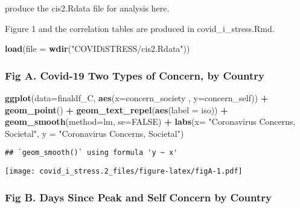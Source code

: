 \documentclass[
]{article}
\newenvironment{Shaded}{\begin{snugshade}}{\end{snugshade}}
\newcommand{\DataTypeTok}[1]{\textcolor[rgb]{0.13,0.29,0.53}{#1}}
\newcommand{\KeywordTok}[1]{\textcolor[rgb]{0.13,0.29,0.53}{\textbf{#1}}}
\newcommand{\NormalTok}[1]{#1}
\newcommand{\OperatorTok}[1]{\textcolor[rgb]{0.81,0.36,0.00}{\textbf{#1}}}
\newcommand{\OtherTok}[1]{\textcolor[rgb]{0.56,0.35,0.01}{#1}}
\newcommand{\StringTok}[1]{\textcolor[rgb]{0.31,0.60,0.02}{#1}}
\begin{document}
produce the cis2.Rdata file for analysis here.

Figure 1 and the correlation tables are produced in
covid\_i\_stress.Rmd.

\begin{Shaded}
\begin{Highlighting}[]
\KeywordTok{load}\NormalTok{(}\DataTypeTok{file =} \KeywordTok{wdir}\NormalTok{(}\StringTok{"COVIDiSTRESS/cis2.Rdata"}\NormalTok{))}
\end{Highlighting}
\end{Shaded}

\hypertarget{fig-a.-covid-19-two-types-of-concern-by-country}{%
\subsubsection{Fig A. Covid-19 Two Types of Concern, by
Country}\label{fig-a.-covid-19-two-types-of-concern-by-country}}

\begin{Shaded}
\begin{Highlighting}[]
\KeywordTok{ggplot}\NormalTok{(}\DataTypeTok{data=}\NormalTok{finaldf_C, }\KeywordTok{aes}\NormalTok{(}\DataTypeTok{x=}\NormalTok{concern_society , }\DataTypeTok{y=}\NormalTok{concern_self)) }\OperatorTok{+}
\StringTok{  }\KeywordTok{geom_point}\NormalTok{() }\OperatorTok{+}
\StringTok{  }\KeywordTok{geom_text_repel}\NormalTok{(}\KeywordTok{aes}\NormalTok{(}\DataTypeTok{label =}\NormalTok{ iso)) }\OperatorTok{+}
\StringTok{  }\KeywordTok{geom_smooth}\NormalTok{(}\DataTypeTok{method=}\NormalTok{lm, }\DataTypeTok{se=}\OtherTok{FALSE}\NormalTok{) }\OperatorTok{+}
\StringTok{  }\KeywordTok{labs}\NormalTok{(}\DataTypeTok{x=} \StringTok{"Coronavirus Concerns, Societal"}\NormalTok{, }\DataTypeTok{y =} \StringTok{"Coronavirus Concerns, Societal"}\NormalTok{)}
\end{Highlighting}
\end{Shaded}

\begin{verbatim}
## `geom_smooth()` using formula 'y ~ x'
\end{verbatim}

\texttt{[image: covid\_i\_stress.2\_files/figure-latex/figA-1.pdf]}

\hypertarget{fig-b.-days-since-peak-and-self-concern-by-country}{%
\subsubsection{Fig B. Days Since Peak and Self Concern by
Country}\label{fig-b.-days-since-peak-and-self-concern-by-country}}
\end{document}
